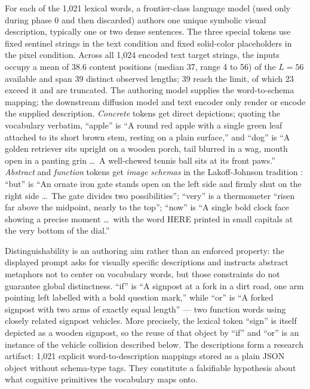 \documentclass[11pt,a4paper]{article}
\begin{document}
For each of the 1,021 lexical words, a frontier-class language model (used only during phase 0 and then discarded) authors one unique symbolic visual description, typically one or two dense sentences. The three special tokens use fixed sentinel strings in the text condition and fixed solid-color placeholders in the pixel condition. Across all 1,024 encoded text target strings, the inputs occupy a mean of 38.6 content positions (median 37, range 4 to 56) of the $L=56$ available and span 39 distinct observed lengths; 39 reach the limit, of which 23 exceed it and are truncated. The authoring model supplies the word-to-schema mapping; the downstream diffusion model and text encoder only render or encode the supplied description. \emph{Concrete} tokens get direct depictions; quoting the vocabulary verbatim, ``apple'' is ``A round red apple with a single green leaf attached to its short brown stem, resting on a plain surface,'' and ``dog'' is ``A golden retriever sits upright on a wooden porch, tail blurred in a wag, mouth open in a panting grin \dots\ A well-chewed tennis ball sits at its front paws.'' \emph{Abstract} and \emph{function} tokens get \emph{image schemas} in the Lakoff-Johnson tradition \cite{lakoff_johnson}: ``but'' is ``An ornate iron gate stands open on the left side and firmly shut on the right side \dots\ The gate divides two possibilities''; ``very'' is a thermometer ``risen far above the midpoint, nearly to the top''; ``now'' is ``A single bold clock face showing a precise moment \dots\ with the word HERE printed in small capitals at the very bottom of the dial.''

Distinguishability is an authoring aim rather than an enforced property: the displayed prompt asks for visually specific descriptions and instructs abstract metaphors not to center on vocabulary words, but those constraints do not guarantee global distinctness. ``if'' is ``A signpost at a fork in a dirt road, one arm pointing left labelled with a bold question mark,'' while ``or'' is ``A forked signpost with two arms of exactly equal length'' --- two function words using closely related signpost vehicles. More precisely, the lexical token ``sign'' is itself depicted as a wooden signpost, so the reuse of that object by ``if'' and ``or'' is an instance of the vehicle collision described below. The descriptions form a research artifact: 1,021 explicit word-to-description mappings stored as a plain JSON object without schema-type tags. They constitute a falsifiable hypothesis about what cognitive primitives the vocabulary maps onto.
\end{document}
